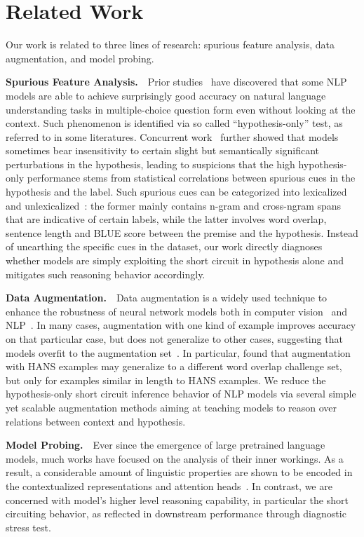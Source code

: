 \section{Related Work}
Our work is  related to three lines of research: spurious feature analysis, data augmentation, and model probing.


\textbf{Spurious Feature Analysis.}~~Prior studies~\cite{endingonly1,srinivasan2018simple,zellers2018swag} have discovered that some NLP models are able to achieve surprisingly good accuracy on natural language understanding tasks in multiple-choice question form even without looking at the context. Such phenomenon is identified via so called ``hypothesis-only'' test, as referred to in some literatures. Concurrent work~\cite{sanchez2018behavior} further showed that models sometimes bear insensitivity to certain slight but semantically significant perturbations in the hypothesis, leading to suspicions that the high hypothesis-only performance  stems from statistical correlations between spurious cues in the hypothesis and the label. Such spurious cues can be categorized into lexicalized~\cite{naik2018stress,sanchez2018behavior,mccoy2019right} and unlexicalized~\cite{bowman2015large}: the former mainly contains n-gram and cross-ngram spans that are indicative of certain labels, while the latter involves word overlap, sentence length and BLUE score between the premise and the hypothesis. Instead of unearthing the specific cues in the dataset, our work directly diagnoses whether models are simply exploiting the short circuit in hypothesis alone and mitigates such reasoning behavior accordingly.

\textbf{Data Augmentation.}~~Data augmentation is a widely used technique to enhance the robustness of neural network models both in computer vision~\cite{perez2017} and NLP~\cite{belinkov2017,Minervini2018,Yanaka2019}. In many cases, augmentation with one kind of example improves accuracy on that particular case, but does not generalize to other cases, suggesting that models overfit to the augmentation set~\cite{Iyyer2018,Liu2019a}. In particular, \citet{mccoy2019right} found that augmentation with HANS examples may generalize to a different word overlap challenge set, but only for examples similar in length to HANS examples. We reduce the hypothesis-only short circuit inference behavior of NLP models via several simple yet scalable augmentation methods aiming at teaching models to reason over relations between context and hypothesis.

\textbf{Model Probing.}~~Ever since the emergence of large pretrained language models, much works have focused on the analysis of their inner workings. As a result, a considerable amount of linguistic properties are shown to be encoded in the contextualized representations and attention heads~\cite{goldberg2019,clark2019,liu-etal-2019-linguistic,tenny2019}. In contrast, we are concerned with model's higher level reasoning capability, in particular the short circuiting behavior, as reflected in downstream performance through diagnostic stress test.

